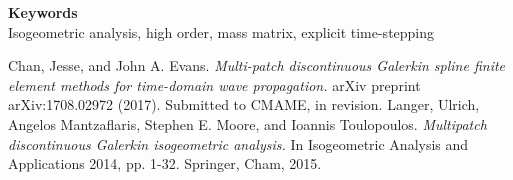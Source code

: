 \documentclass[a4paper]{article} %
\def\keywords#1{\begin{center}{\bf Keywords}\\{#1}\end{center}} %
\begin{document}
\keywords{Isogeometric analysis, high order, mass matrix, explicit time-stepping} %

\begin{thebibliography}{1}
 Chan, Jesse, and John A. Evans. \emph{Multi-patch discontinuous Galerkin spline finite element methods for time-domain wave propagation.} arXiv preprint arXiv:1708.02972 (2017).  Submitted to CMAME, in revision.
 Langer, Ulrich, Angelos Mantzaflaris, Stephen E. Moore, and Ioannis Toulopoulos. \emph{Multipatch discontinuous Galerkin isogeometric analysis.} In Isogeometric Analysis and Applications 2014, pp. 1-32. Springer, Cham, 2015.  	
\end{thebibliography}



\end{document}
